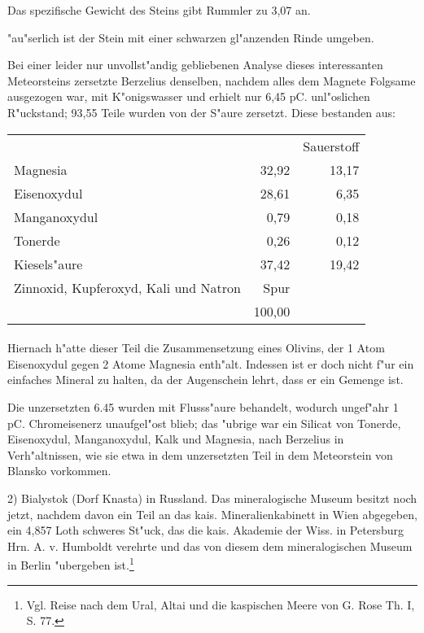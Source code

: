 \documentclass[a4paper, 11pt, oneside]{article}
\begin{document}
Das spezifische Gewicht des Steins gibt Rummler zu 3,07 an.

"au"serlich ist der Stein mit einer schwarzen gl"anzenden Rinde umgeben.

Bei einer leider nur unvollst"andig gebliebenen Analyse dieses interessanten Meteorsteins zersetzte Berzelius denselben, nachdem alles dem Magnete Folgsame ausgezogen war, mit K"onigswasser und erhielt nur 6,45 pC. unl"oslichen R"uckstand; 93,55 Teile wurden von der S"aure zersetzt. Diese bestanden aus:
\begin{center}
\begin{tabular}{ l r r }
     & & Sauerstoff\\
    Magnesia & 32,92 & 13,17\\
    Eisenoxydul & 28,61 & 6,35\\
    Manganoxydul & 0,79 & 0,18\\
    Tonerde & 0,26 & 0,12\\
    Kiesels"aure & 37,42 & 19,42\\  
    Zinnoxid, Kupferoxyd, Kali und Natron & Spur & \\  
     & 100,00 & \\
\end{tabular}
\end{center}
\paragraph{}
Hiernach h"atte dieser Teil die Zusammensetzung eines Olivins, der 1 Atom Eisenoxydul gegen 2 Atome Magnesia enth"alt. Indessen ist er doch nicht f"ur ein einfaches Mineral zu halten, da der Augenschein lehrt, dass er ein Gemenge ist.

Die unzersetzten 6.45 wurden mit Flusss"aure behandelt, wodurch ungef"ahr 1 pC. Chromeisenerz unaufgel"ost blieb; das "ubrige war ein Silicat von Tonerde, Eisenoxydul, Manganoxydul, Kalk und Magnesia, nach Berzelius in Verh"altnissen, wie sie etwa in dem unzersetzten Teil in dem Meteorstein von Blansko vorkommen.

2) Bialystok (Dorf Knasta) in Russland. Das mineralogische Museum besitzt noch jetzt, nachdem davon ein Teil an das kais. Mineralienkabinett in Wien abgegeben, ein 4,857 Loth schweres St"uck, das die kais. Akademie der Wiss. in Petersburg Hrn. A. v. Humboldt verehrte und das von diesem dem mineralogischen Museum in Berlin "ubergeben ist.\footnote{Vgl. Reise nach dem Ural, Altai und die kaspischen Meere von G. Rose Th. I, S. 77.}
\end{document}
